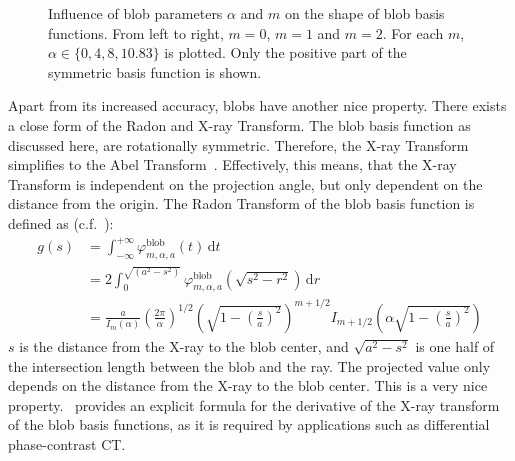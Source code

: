 \begin{figure}
	\centering
	\caption{Influence of blob parameters \(\alpha\) and \(m\) on the shape of blob basis
		functions. From left to right, \(m = 0\), \(m = 1\) and \(m = 2\). For each \(m\),
		\(\alpha \in \lbrace 0, 4, 8, 10.83 \rbrace\) is plotted. Only the positive part of
		the symmetric basis function is shown.
	}\label{fig:blob_parameter_overview}
\end{figure}

Apart from its increased accuracy, blobs have another nice property. There exists a close form of
the Radon and X-ray Transform. The blob basis function as discussed here, are rotationally
symmetric. Therefore, the X-ray Transform simplifies to the Abel
Transform~\cite{buzug_computed_2008}. Effectively, this means, that the X-ray Transform is
independent on the projection angle, but only dependent on the distance from the origin. The Radon
Transform of the blob basis function is defined as
(c.f.~\cite{lewitt_multidimensional_1990,lewitt_alternatives_1992}):
\begin{align}\label{eq:radon_blob_basis}
	g(s) & = \int_{-\infty}^{+\infty} \varphi^{\text{blob}}_{m, \alpha, a}\left(t\right) \, \mathrm{d} t                                                                                                       \\
	     & = 2 \int_0^{\sqrt{(a^2-s^2)}} \varphi^{\text{blob}}_{m, \alpha, a}\left(\sqrt{s^2 - r^2}\right) \, \mathrm{d} r                                                                                     \\
	     & = \frac{a}{I_m(\alpha)} \left( \frac{2\pi}{\alpha}\right)^{1/2} \left( \sqrt{1 - \left(\frac{s}{a}\right)^2} \right)^{m + 1/2} I_{m+1/2}\left( \alpha \sqrt{1 - \left(\frac{s}{a}\right)^2} \right)
\end{align}
\(s\) is the distance from the X-ray to the blob center, and \(\sqrt{a^2 - s^2}\) is one half of the
intersection length between the blob and the ray. The projected value only depends on the distance
from the X-ray to the blob center. This is a very nice property.~\cite{xu_investigation_2012}
provides an explicit formula for the derivative of the X-ray transform of the blob basis functions,
as it is required by applications such as differential phase-contrast CT\@.


